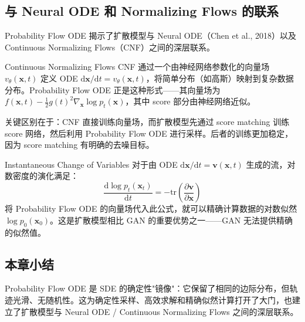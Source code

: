 \subsection{与 Neural ODE 和 Normalizing Flows 的联系}

Probability Flow ODE 揭示了扩散模型与 Neural ODE（Chen et al., 2018）以及 Continuous Normalizing Flows（CNF）之间的深层联系。

\begin{knowledgebox}{Continuous Normalizing Flows}
CNF 通过一个由神经网络参数化的向量场 $v_\theta(\mathbf{x}, t)$ 定义 ODE $\mathrm{d}\mathbf{x}/\mathrm{d}t = v_\theta(\mathbf{x}, t)$，将简单分布（如高斯）映射到复杂数据分布。Probability Flow ODE 正是这种形式——其向量场为 $f(\mathbf{x}, t) - \frac{1}{2}g(t)^2 \nabla_{\mathbf{x}} \log p_t(\mathbf{x})$，其中 score 部分由神经网络近似。

关键区别在于：CNF 直接训练向量场，而扩散模型先通过 score matching 训练 score 网络，然后利用 Probability Flow ODE 进行采样。后者的训练更加稳定，因为 score matching 有明确的去噪目标。
\end{knowledgebox}

\begin{importantbox}{Instantaneous Change of Variables}
对于由 ODE $\mathrm{d}\mathbf{x}/\mathrm{d}t = \mathbf{v}(\mathbf{x}, t)$ 生成的流，对数密度的演化满足：
$$
\frac{\mathrm{d}\log p_t(\mathbf{x}_t)}{\mathrm{d}t} = -\mathrm{tr}\left(\frac{\partial \mathbf{v}}{\partial \mathbf{x}}\right)
$$
将 Probability Flow ODE 的向量场代入此公式，就可以精确计算数据的对数似然 $\log p_0(\mathbf{x}_0)$。这是扩散模型相比 GAN 的重要优势之一——GAN 无法提供精确的似然值。
\end{importantbox}

\subsection{本章小结}

Probability Flow ODE 是 SDE 的确定性"镜像"：它保留了相同的边际分布，但轨迹光滑、无随机性。这为确定性采样、高效求解和精确似然计算打开了大门，也建立了扩散模型与 Neural ODE / Continuous Normalizing Flows 之间的深层联系。


